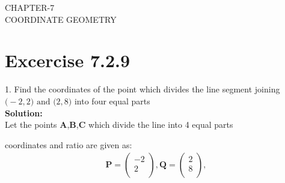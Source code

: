 \documentclass[12pt]{article}
\newcommand{\solution}{\noindent \textbf{Solution: }}
\newcommand{\myvec}[1]{\ensuremath{\begin{pmatrix}#1\end{pmatrix}}}
\let\vec\mathbf
\begin{document}
\begin{center}
\textbf\large{CHAPTER-7 \\ COORDINATE GEOMETRY}
\end{center}
\section*{Excercise 7.2.9}

1. Find the coordinates of the point which divides the line segment joining $\vec(-2,2) \text{ and } \vec(2,8)$ into four equal parts
\\
\solution\\		
Let the points $\vec{A}$,$\vec{B}$,$\vec{C}$ which divide the line into 4 equal parts\\

\begin{table}[ht!]\centering

\caption{}
\label{table:1}	
\end{table}

coordinates and ratio are given as:
\begin{align}
\vec{P}=\myvec{-2\\2\\},
\vec{Q}=\myvec{2\\8\\},
\end{align}
\end{document}

